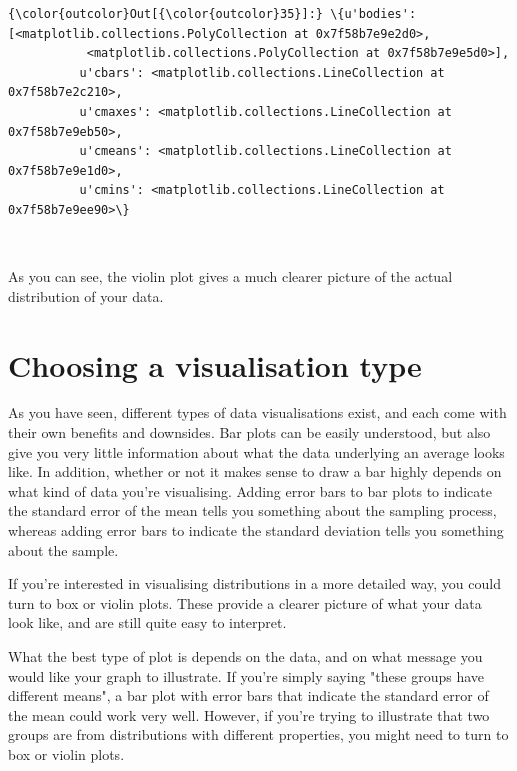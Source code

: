 \documentclass[11pt]{article}
\begin{document}
\begin{Verbatim}[commandchars=\\\{\}]
{\color{outcolor}Out[{\color{outcolor}35}]:} \{u'bodies': [<matplotlib.collections.PolyCollection at 0x7f58b7e9e2d0>,
           <matplotlib.collections.PolyCollection at 0x7f58b7e9e5d0>],
          u'cbars': <matplotlib.collections.LineCollection at 0x7f58b7e2c210>,
          u'cmaxes': <matplotlib.collections.LineCollection at 0x7f58b7e9eb50>,
          u'cmeans': <matplotlib.collections.LineCollection at 0x7f58b7e9e1d0>,
          u'cmins': <matplotlib.collections.LineCollection at 0x7f58b7e9ee90>\}
\end{Verbatim}
            
    \begin{center}
    \end{center}
    { \hspace*{\fill} \\}
    
    As you can see, the violin plot gives a much clearer picture of the
actual distribution of your data.

    \section{Choosing a visualisation
type}\label{choosing-a-visualisation-type}

As you have seen, different types of data visualisations exist, and each
come with their own benefits and downsides. Bar plots can be easily
understood, but also give you very little information about what the
data underlying an average looks like. In addition, whether or not it
makes sense to draw a bar highly depends on what kind of data you're
visualising. Adding error bars to bar plots to indicate the standard
error of the mean tells you something about the sampling process,
whereas adding error bars to indicate the standard deviation tells you
something about the sample.

If you're interested in visualising distributions in a more detailed
way, you could turn to box or violin plots. These provide a clearer
picture of what your data look like, and are still quite easy to
interpret.

What the best type of plot is depends on the data, and on what message
you would like your graph to illustrate. If you're simply saying "these
groups have different means", a bar plot with error bars that indicate
the standard error of the mean could work very well. However, if you're
trying to illustrate that two groups are from distributions with
different properties, you might need to turn to box or violin plots.
\end{document}
